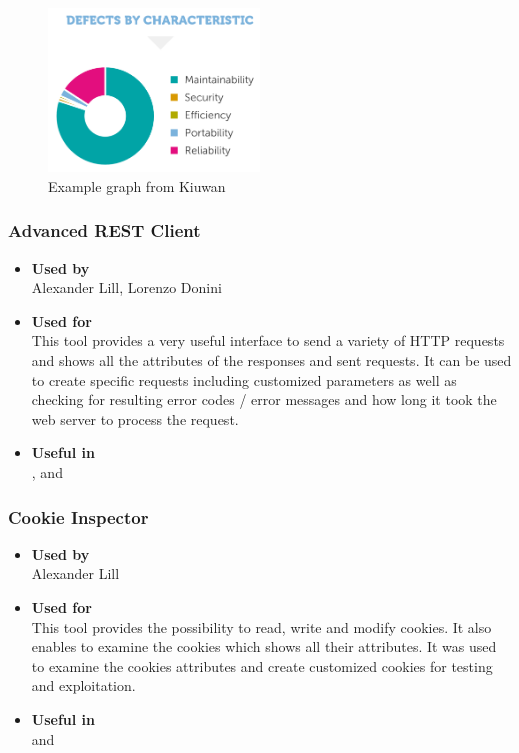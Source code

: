 \begin{figure}[h!tbp]
	\centering
	\includegraphics[width=0.5\textwidth]{figures/kiuwanResults}
	\caption{Example graph from Kiuwan}
	\label{figure:kiuwan}
\end{figure}

\subsubsection*{Advanced REST Client}
\begin{itemize}
	\item \textbf{Used by}\\ Alexander Lill, Lorenzo Donini
	\item \textbf{Used for}\\
	This tool provides a very useful interface to send a variety of HTTP requests and shows all the attributes of the responses and sent requests. It can be used to create specific requests including customized parameters as well as checking for resulting error codes / error messages and how long it took the web server to process the request.
	\item \textbf{Useful in}\\ ,  and 
\end{itemize}

\subsubsection*{Cookie Inspector}
\begin{itemize}
	\item \textbf{Used by}\\ Alexander Lill
	\item \textbf{Used for}\\
	This tool provides the possibility to read, write and modify cookies. It also enables to examine the cookies which shows all their attributes. It was used to examine the cookies attributes and create customized cookies for testing and exploitation.
	\item \textbf{Useful in}\\  and 
\end{itemize}

